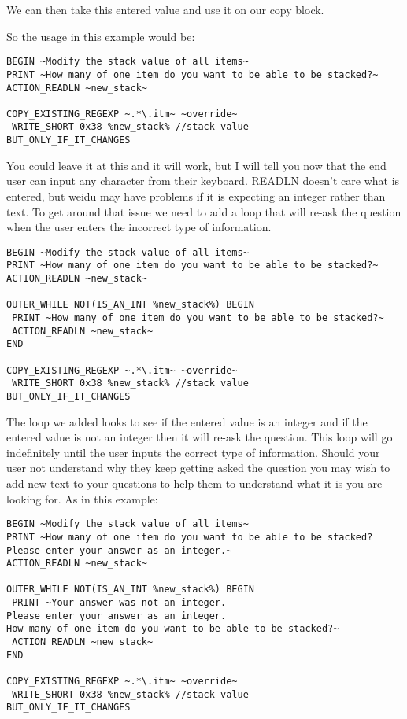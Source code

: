 \documentclass{article}
\begin{document}
We can then take this entered value and use it on our copy block.

So the usage in this example would be:

\begin{verbatim}
BEGIN ~Modify the stack value of all items~
PRINT ~How many of one item do you want to be able to be stacked?~
ACTION_READLN ~new_stack~

COPY_EXISTING_REGEXP ~.*\.itm~ ~override~
 WRITE_SHORT 0x38 %new_stack% //stack value
BUT_ONLY_IF_IT_CHANGES
\end{verbatim}

You could leave it at this and it will work, but I will tell you now that the end
user can input any character from their keyboard.  READLN doesn't care what is
entered, but weidu may have problems if it is expecting an integer rather than text.
To get around that issue we need to add a loop that will re-ask the question when the
user enters the incorrect type of information.

\begin{verbatim}
BEGIN ~Modify the stack value of all items~
PRINT ~How many of one item do you want to be able to be stacked?~
ACTION_READLN ~new_stack~

OUTER_WHILE NOT(IS_AN_INT %new_stack%) BEGIN
 PRINT ~How many of one item do you want to be able to be stacked?~
 ACTION_READLN ~new_stack~
END

COPY_EXISTING_REGEXP ~.*\.itm~ ~override~
 WRITE_SHORT 0x38 %new_stack% //stack value
BUT_ONLY_IF_IT_CHANGES
\end{verbatim}

The loop we added looks to see if the entered value is an integer and if the
entered value is not an integer then it will re-ask the question.  This loop
will go indefinitely until the user inputs the correct type of information.
Should your user not understand why they keep getting asked the question you may
wish to add new text to your questions to help them to understand what it is
you are looking for.  As in this example:

\begin{verbatim}
BEGIN ~Modify the stack value of all items~
PRINT ~How many of one item do you want to be able to be stacked?
Please enter your answer as an integer.~
ACTION_READLN ~new_stack~

OUTER_WHILE NOT(IS_AN_INT %new_stack%) BEGIN
 PRINT ~Your answer was not an integer.
Please enter your answer as an integer.
How many of one item do you want to be able to be stacked?~
 ACTION_READLN ~new_stack~
END

COPY_EXISTING_REGEXP ~.*\.itm~ ~override~
 WRITE_SHORT 0x38 %new_stack% //stack value
BUT_ONLY_IF_IT_CHANGES
\end{verbatim}
\end{document}
